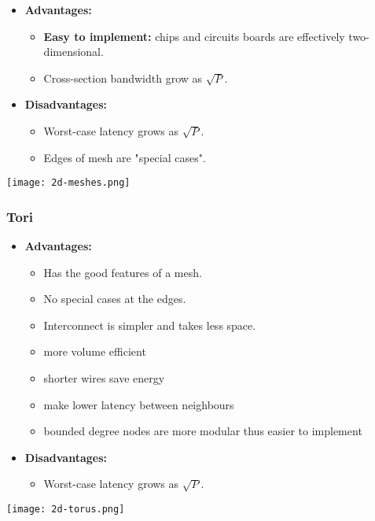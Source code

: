 \documentclass[../main.tex]{subfiles}
\begin{document}
\begin{multicols}{2}
	\begin{itemize}
		\item \textbf{Advantages:}
		      \begin{itemize}
			      \item \textbf{Easy to implement:} chips and circuits boards are effectively two-dimensional.
			      \item Cross-section bandwidth grow as \(\sqrt{P}\).
		      \end{itemize}
		\item \textbf{Disadvantages:}
		      \begin{itemize}
			      \item Worst-case latency grows as \(\sqrt{P}\).
			      \item Edges of mesh are "special cases".
		      \end{itemize}
	\end{itemize}

	\begin{center}
		\texttt{[image: 2d-meshes.png]}
	\end{center}
\end{multicols}


\subsubsection{Tori}

\begin{multicols}{2}
	\begin{itemize}
		\item \textbf{Advantages:}
		      \begin{itemize}
			      \item Has the good features of a mesh.
			      \item No special cases at the edges.
			      \item Interconnect is simpler and takes less space.
			      \item more volume efficient
			      \item shorter wires save energy
			      \item make lower latency between neighbours
			      \item bounded degree nodes are more modular thus easier to implement
		      \end{itemize}
		\item \textbf{Disadvantages:}
		      \begin{itemize}
			      \item Worst-case latency grows as \(\sqrt{P}\).
		      \end{itemize}
	\end{itemize}

	\begin{center}
		\texttt{[image: 2d-torus.png]}
	\end{center}
\end{multicols}
\end{document}
